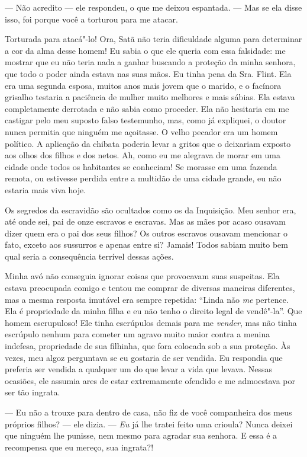 --- Não acredito --- ele respondeu, o que me deixou espantada. --- Mas
se ela disse isso, foi porque você a torturou para me atacar.

Torturada para atacá"-lo! Ora, Satã não teria dificuldade alguma para
determinar a cor da alma desse homem! Eu sabia o que ele queria com essa
falsidade: me mostrar que eu não teria nada a ganhar buscando a proteção
da minha senhora, que todo o poder ainda estava nas suas mãos. Eu tinha
pena da Sra. Flint. Ela era uma segunda esposa, muitos anos mais jovem
que o marido, e o facínora grisalho testaria a paciência de mulher muito
melhores e mais sábias. Ela estava completamente derrotada e não sabia
como proceder. Ela não hesitaria em me castigar pelo meu suposto falso
testemunho, mas, como já expliquei, o doutor nunca permitia que ninguém
me açoitasse. O velho pecador era um homem político. A aplicação da
chibata poderia levar a gritos que o deixariam exposto aos olhos dos
filhos e dos netos. Ah, como eu me alegrava de morar em uma cidade onde
todos os habitantes se conheciam! Se morasse em uma fazenda remota, ou
estivesse perdida entre a multidão de uma cidade grande, eu não estaria
mais viva hoje.

Os segredos da escravidão são ocultados
como os da Inquisição. Meu senhor era, até onde sei, pai de onze
escravos e escravas. Mas as mães por acaso ousavam dizer quem era o pai
dos seus filhos? Os outros escravos ousavam mencionar o fato, exceto aos
sussurros e apenas entre si? Jamais! Todos sabiam muito bem qual seria a
consequência terrível dessas ações.

Minha avó não conseguia ignorar coisas
que provocavam suas suspeitas. Ela estava preocupada comigo e tentou me
comprar de diversas maneiras diferentes, mas a mesma resposta imutável
era sempre repetida: ``Linda não \emph{me} pertence. Ela é propriedade
da minha filha e eu não tenho o direito legal de vendê"-la''. Que homem
escrupuloso! Ele tinha escrúpulos demais para me \emph{vender}, mas não
tinha escrúpulo nenhum para cometer um agravo muito maior contra a
menina indefesa, propriedade de sua filhinha, que fora colocada sob a
sua proteção. Às vezes, meu algoz perguntava se eu gostaria de ser
vendida. Eu respondia que preferia ser vendida a qualquer um do que
levar a vida que levava. Nessas ocasiões, ele assumia ares de estar
extremamente ofendido e me admoestava por ser tão ingrata.

--- Eu não a trouxe para dentro de casa, não fiz de você companheira dos
meus próprios filhos? --- ele dizia. --- \emph{Eu} já lhe tratei feito
uma crioula? Nunca deixei que ninguém lhe punisse, nem mesmo para
agradar sua senhora. E essa é a recompensa que eu mereço, sua ingrata?!

